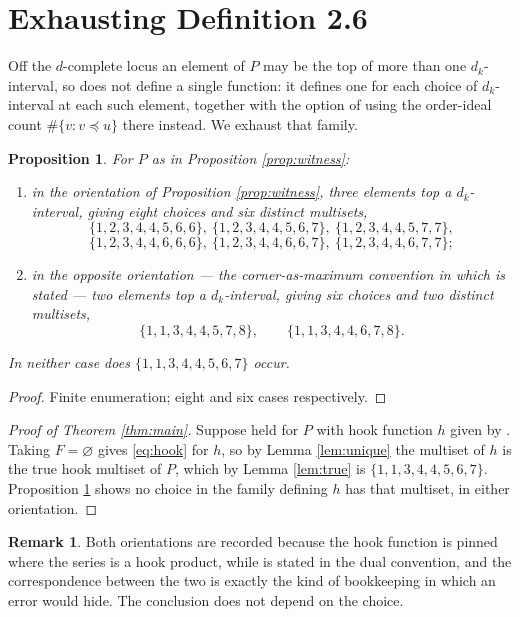 \documentclass[reqno]{amsart}
\theoremstyle{plain}
\newtheorem{proposition}[theorem]{Proposition}
\theoremstyle{definition}
\newtheorem{remark}[theorem]{Remark}
\newcommand{\dk}{d_k}
\begin{document}
\section{Exhausting Definition 2.6}

Off the $d$-complete locus an element of $P$ may be the top of more than one
$\dk$-interval, so \cite[Def.~2.6]{NO} does not define a single function: it
defines one for each choice of $\dk$-interval at each such element, together
with the option of using the order-ideal count $\#\{v:v\preceq u\}$ there
instead.  We exhaust that family.

\begin{proposition}\label{prop:exhaust}
For $P$ as in Proposition \ref{prop:witness}:
\begin{enumerate}
\item in the orientation of Proposition \ref{prop:witness}, three elements top
a $\dk$-interval, giving eight choices and six distinct multisets,
\[
  \{1,2,3,4,4,5,6,6\},\ \{1,2,3,4,4,5,6,7\},\ \{1,2,3,4,4,5,7,7\},
\]
\[
  \{1,2,3,4,4,6,6,6\},\ \{1,2,3,4,4,6,6,7\},\ \{1,2,3,4,4,6,7,7\};
\]
\item in the opposite orientation --- the corner-as-maximum convention in which
\cite[Def.~2.6]{NO} is stated --- two elements top a $\dk$-interval, giving six
choices and two distinct multisets,
\[
  \{1,1,3,4,4,5,7,8\},\qquad \{1,1,3,4,4,6,7,8\}.
\]
\end{enumerate}
In neither case does $\{1,1,3,4,4,5,6,7\}$ occur.
\end{proposition}

\begin{proof}
Finite enumeration; eight and six cases respectively.
\end{proof}

\begin{proof}[Proof of Theorem \ref{thm:main}]
Suppose \cite[Thm.~1.2]{NO} held for $P$ with hook function $h$ given by
\cite[Def.~2.6]{NO}.  Taking $F=\varnothing$ gives \eqref{eq:hook} for $h$, so
by Lemma \ref{lem:unique} the multiset of $h$ is the true hook multiset of
$P$, which by Lemma \ref{lem:true} is $\{1,1,3,4,4,5,6,7\}$.  Proposition
\ref{prop:exhaust} shows no choice in the family defining $h$ has that
multiset, in either orientation.
\end{proof}

\begin{remark}\label{rem:orient}
Both orientations are recorded because the hook function is pinned where the
series is a hook product, while \cite[Def.~2.6]{NO} is stated in the dual
convention, and the correspondence between the two is exactly the kind of
bookkeeping in which an error would hide.  The conclusion does not depend on
the choice.
\end{remark}
\end{document}
